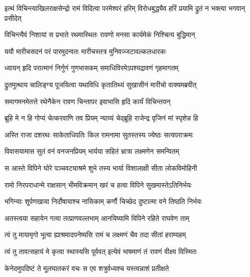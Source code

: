 \fourlineindentedshloka
{इत्थं विचिन्त्याखिलराक्षसेन्द्रो}
{रामं विदित्वा परमेश्वरं हरिम्}
{विरोधबुद्ध्यैव हरिं प्रयामि}
{द्रुतं न भक्त्या भगवान् प्रसीदेत्} %





\twolineshloka
{विचिन्त्यैवं निशायां स प्रभाते रथमास्थितः}
{रावणो मनसा कार्यमेकं निश्चित्य बुद्धिमान्} %

\twolineshloka
{ययौ मारीचसदनं परं पारमुदन्वतः}
{मारीचस्तत्र मुनिवज्जटावल्कलधारकः} %

\twolineshloka
{ध्यायन् हृदि परात्मानं निर्गुणं गुणभासकम्}
{समाधिविरमेऽपश्यद्रावणं गृहमागतम्} %

\twolineshloka
{द्रुतमुत्थाय चालिङ्ग्य पूजयित्वा यथाविधि}
{कृतातिथ्यं सुखासीनं मारीचो वाक्यमब्रवीत्} %

\twolineshloka
{समागमनमेतत्ते रथेनैकेन रावण}
{चिन्तापर इवाभासि हृदि कार्यं विचिन्तयन्} %

\twolineshloka
{ब्रूहि मे न हि गोप्यं चेत्करवाणि तव प्रियम्}
{न्याय्यं चेद्ब्रूहि राजेन्द्र वृजिनं मां स्पृशेन्न हि} %


\twolineshloka
{अस्ति राजा दशरथः साकेताधिपतिः किल}
{रामनामा सुतस्तस्य ज्येष्ठः सत्यपराक्रमः} %

\twolineshloka
{विवासयामास सुतं वनं वनजनप्रियम्}
{भार्यया सहितं भ्रात्रा लक्ष्मणेन समन्वितम्} %

\twolineshloka
{स आस्ते विपिने घोरे पञ्चवट्याश्रमे शुभे}
{तस्य भार्या विशालाक्षी सीता लोकविमोहिनी} %

\twolineshloka
{रामो निरपराधान्मे राक्षसान् भीमविक्रमान्}
{खरं च हत्वा विपिने सुखमास्तेऽतिनिर्भयः} %

\twolineshloka
{भगिन्याः शूर्पणखाया निर्दोषायाश्च नासिकाम्}
{कर्णौ चिच्छेद दुष्टात्मा वने तिष्ठति निर्भयः} %

\twolineshloka
{अतस्त्वया सहायेन गत्वा तत्प्राणवल्लभाम्}
{आनयिष्यामि विपिने रहिते राघवेण ताम्} %

\twolineshloka
{त्वं तु मायामृगो भूत्वा ह्याश्रमादपनेष्यसि}
{रामं च लक्ष्मणं चैव तदा सीतां हराम्यहम्} %

\twolineshloka
{त्वं तु तावत्सहायं मे कृत्वा स्थास्यसि पूर्ववत्}
{इत्येवं भाषमाणं तं रावणं वीक्ष्य विस्मितः} %

\twolineshloka
{केनेदमुपदिष्टं ते मूलघातकरं वचः}
{स एव शत्रुर्वध्यश्च यस्त्वन्नाशं प्रतीक्षते} %

